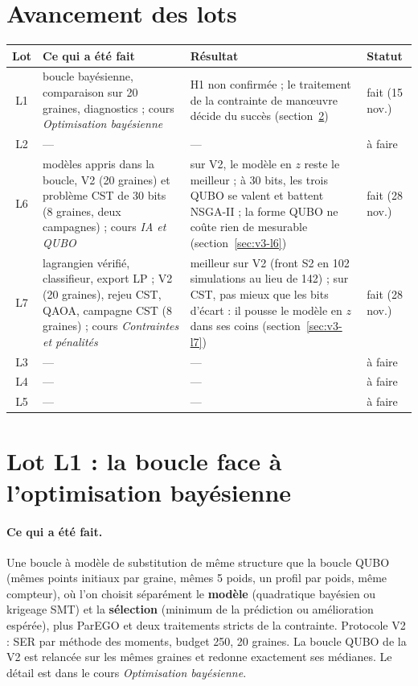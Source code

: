 \documentclass[11pt,a4paper]{report}
\begin{document}
\section{Avancement des lots}
\begin{center}
\renewcommand{\arraystretch}{1.2}
\small
\begin{tabularx}{\linewidth}{c>{\raggedright\arraybackslash}p{3.0cm}>{\raggedright\arraybackslash}X>{\raggedright\arraybackslash}p{1.6cm}}
\toprule
Lot & Ce qui a été fait & Résultat & Statut \\
\midrule
L1 & boucle bayésienne, comparaison sur 20 graines, diagnostics ; cours \emph{Optimisation bayésienne} & H1 non confirmée ; le traitement de la contrainte de manœuvre décide du succès (section~\ref{sec:v3-l1}) & fait \newline(15 nov.) \\
L2 & --- & --- & à faire \\
L6 & modèles appris dans la boucle, V2 (20 graines) et problème CST de 30 bits (8 graines, deux campagnes) ; cours \emph{IA et QUBO} & sur V2, le modèle en $z$ reste le meilleur ; à 30 bits, les trois QUBO se valent et battent NSGA-II ; la forme QUBO ne coûte rien de mesurable (section~\ref{sec:v3-l6}) & fait \newline(28 nov.) \\
L7 & lagrangien vérifié, classifieur, export LP ; V2 (20 graines), rejeu CST, QAOA, campagne CST (8 graines) ; cours \emph{Contraintes et pénalités} & meilleur sur V2 (front S2 en 102 simulations au lieu de 142) ; sur CST, pas mieux que les bits d'écart : il pousse le modèle en $z$ dans ses coins (section~\ref{sec:v3-l7}) & fait \newline(28 nov.) \\
L3 & --- & --- & à faire \\
L4 & --- & --- & à faire \\
L5 & --- & --- & à faire \\
\bottomrule
\end{tabularx}
\end{center}

\section{Lot L1 : la boucle face à l'optimisation bayésienne}\label{sec:v3-l1}
\paragraph{Ce qui a été fait.} Une boucle à modèle de substitution de même structure que la boucle QUBO (mêmes points initiaux par graine, mêmes 5 poids, un profil par poids, même compteur), où l'on choisit séparément le \textbf{modèle} (quadratique bayésien ou krigeage SMT) et la \textbf{sélection} (minimum de la prédiction ou amélioration espérée), plus ParEGO et deux traitements stricts de la contrainte. Protocole V2 : SER par méthode des moments, budget 250, 20 graines. La boucle QUBO de la V2 est relancée sur les mêmes graines et redonne exactement ses médianes. Le détail est dans le cours \emph{Optimisation bayésienne}.
\end{document}
